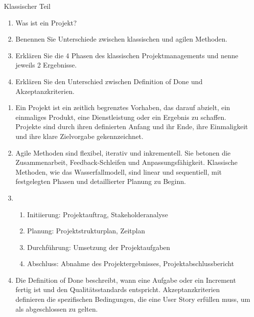 \documentclass{article}
\begin{document}
\begin{exercise}{Klassischer Teil}
  \begin{enumerate}
    \item Was ist ein Projekt?
    \item Benennen Sie Unterschiede zwischen klassischen und agilen Methoden.
    \item Erklären Sie die 4 Phasen des klassischen Projektmanagements und nenne jeweils 2 Ergebnisse.
    \item Erklären Sie den Unterschied zwischen Definition of Done und Akzeptanzkriterien.
  \end{enumerate}

  \begin{solution}
    \begin{enumerate}
      \item Ein Projekt ist ein zeitlich begrenztes Vorhaben, das darauf abzielt, ein einmaliges Produkt, eine Dienstleistung oder ein Ergebnis zu schaffen. Projekte sind durch ihren definierten Anfang und ihr Ende, ihre Einmaligkeit und ihre klare Zielvorgabe gekennzeichnet.
      \item Agile Methoden sind flexibel, iterativ und inkrementell. Sie betonen die Zusammenarbeit, Feedback-Schleifen und Anpassungsfähigkeit. Klassische Methoden, wie das Wasserfallmodell, sind linear und sequentiell, mit festgelegten Phasen und detaillierter Planung zu Beginn.
      \item
            \begin{enumerate}
              \item Initiierung: Projektauftrag, Stakeholderanalyse
              \item Planung: Projektstrukturplan, Zeitplan
              \item Durchführung: Umsetzung der Projektaufgaben
              \item Abschluss: Abnahme des Projektergebnisses, Projektabschlussbericht
            \end{enumerate}
      \item Die Definition of Done beschreibt, wann eine Aufgabe oder ein Increment fertig ist und den Qualitätsstandards entspricht. Akzeptanzkriterien definieren die spezifischen Bedingungen, die eine User Story erfüllen muss, um als abgeschlossen zu gelten.
    \end{enumerate}
  \end{solution}
\end{exercise}
\end{document}
